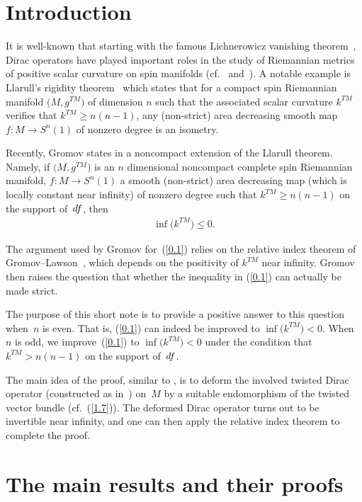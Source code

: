 \documentclass[11pt]{article}
\numberwithin{equation}{section}
\numberwithin{equation}{section}
\theoremstyle{definition}
\begin{document}
\section{Introduction} \label{s0}

It is well-known that starting with the famous Lichnerowicz vanishing theorem~\cite{L63}, Dirac operators have played important roles in the study of Riemannian metrics of positive scalar curvature on spin manifolds (cf.~\cite{GL83} and~\cite{LaMi89}). A notable example is Llarull's rigidity theorem~\cite{L98} which states that for a compact spin Riemannian manifold $\big(M,g^{TM}\big)$ of dimension $n$ such that the associated scalar curvature $k^{TM}$ verifies that $k^{TM}\geq n(n-1)$, any (non-strict) area decreasing smooth map $f\colon M\rightarrow S^n(1)$ of nonzero degree is an isometry.

Recently, Gromov states in \cite[p.~45]{Gr19} a noncompact extension of the Llarull theorem. Namely, if $\big(M,g^{TM}\big)$ is an $n$ dimensional noncompact complete spin Riemannian manifold, $f\colon M\rightarrow S^n(1)$ a smooth (non-strict) area decreasing map (which is locally constant near infinity) of nonzero degree such that $k^{TM}\geq n(n-1)$ on the support of~${\rm d}f$, then
\begin{gather}\label{0.1}
\inf \big(k^{TM}\big)\leq 0.
\end{gather}

The argument used by Gromov for~(\ref{0.1}) relies on the relative index theorem of Gromov--Lawson~\cite{GL83}, which depends on the positivity of $k^{TM}$ near infinity. Gromov then raises the question that whether the inequality in (\ref{0.1}) can actually be made {strict}.

The purpose of this short note is to provide a positive answer to this question when~$n$ is even. That is, (\ref{0.1}) can indeed be improved to $\inf \big(k^{TM}\big)< 0$. When $n$ is odd, we improve~(\ref{0.1}) to $\inf \big(k^{TM}\big)< 0$ under the condition that $k^{TM}> n(n-1)$ on the support of~${\rm d}f$.

The main idea of the proof, similar to \cite[equation~(1.11)]{Z19}, is to deform the involved twisted Dirac operator (constructed as in~\cite{L98})
on~$M$ by a suitable endomorphism of the twisted vector bundle (cf.~(\ref{1.7})). The deformed Dirac operator turns out to be invertible near infinity, and one can then apply the relative index theorem to complete the proof.

\section{The main results and their proofs}\label{s1}
\end{document}

